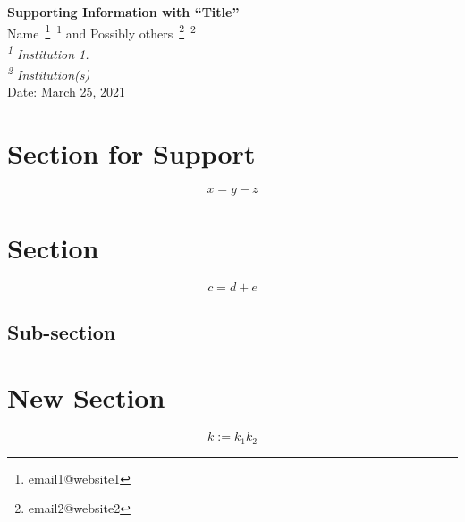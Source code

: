 
\np
\begin{center}
{\bf Supporting Information with ``Title''} \bsk\\
    Name~\footnote{email1@website1}~\textsuperscript{1} 
    and Possibly others~\footnote{email2@website2}~\textsuperscript{2}\\
{\em \textsuperscript{1} Institution 1.}\\
{\em \textsuperscript{2} Institution(s)}\\
Date: March 25, 2021
    \label{support}
\end{center}

\setcounter{equation}{0}
\renewcommand{\theequation}{S\arabic{equation}}

\setcounter{section}{0}

\renewcommand{\thesection}{SI-\arabic{section}}
\renewcommand{\thefigure}{S\arabic{figure}}

\section{Section for Support}
\label{Supp}
%
\begin{equation}
    x = y - z
    \label{xyz}
\end{equation}
%

\renewcommand{\theequation}{\Alph{section}\arabic{equation}}

%
\renewcommand{\thesection}{Appendix~\Alph{section}}
\renewcommand{\thefigure}{\Alph{figure}}
%

\setcounter{section}{0}

\section{Section}

\begin{equation}
    c = d + e
    \label{Eqn2}
\end{equation}
%
\subsection{Sub-section}
\label{AppASub}

\section{New Section}

\begin{equation}
    k := k_1 k_2
    \label{EqnD}
\end{equation}


